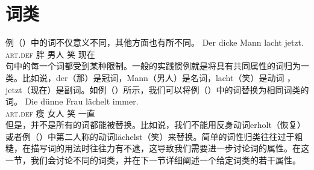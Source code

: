 \section{词类}
\label{Abschnitt-Wortarten}
例（）中的词不仅意义不同，其他方面也有所不同。
\ea
\gll Der dicke Mann lacht jetzt.\\
	\textsc{art}.\textsc{def} 胖 男人 笑 现在\\
\z
句中的每一个词都受到某种限制。一般的实践惯例就是将具有共同属性的词归为一类。比如说，der（那）是冠词，Mann（男人）是名词，lacht（笑）是动词 ，jetzt（现在）是副词。如例（）所示，我们可以将例（）中的词替换为相同词类的词。
\ea
\gll Die dünne Frau lächelt immer.\\
	 \textsc{art}.\textsc{def} 瘦 女人 笑 一直\\
\z
但是，并不是所有的词都能被替换。比如说，我们不能用反身动词erholt（恢复）或者例（）中第二人称的动词lächelst（笑）来替换。简单的词性归类往往过于粗糙，在描写词的用法时往往力有不逮，这导致我们需要进一步讨论词的属性。在这一节，我们会讨论不同的词类，并在下一节详细阐述一个给定词类的若干属性。

